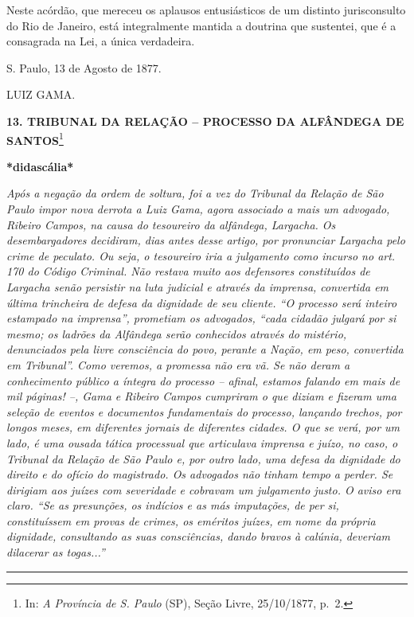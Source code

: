 Neste acórdão, que mereceu os aplausos entusiásticos de um distinto
jurisconsulto do Rio de Janeiro, está integralmente mantida a doutrina
que sustentei, que é a consagrada na Lei, a única verdadeira.

S. Paulo, 13 de Agosto de 1877.

LUIZ GAMA.

\textbf{13. TRIBUNAL DA RELAÇÃO -- PROCESSO DA ALFÂNDEGA DE
SANTOS}\footnote{In: \emph{A Província de S. Paulo} (SP), Seção Livre,
  25/10/1877, p.~2.}

\textbf{*didascália*}

\emph{Após a negação da ordem de soltura, foi a vez do Tribunal da
Relação de São Paulo impor nova derrota a Luiz Gama, agora associado a
mais um advogado, Ribeiro Campos, na causa do tesoureiro da alfândega,
Largacha. Os desembargadores decidiram, dias antes desse artigo, por
pronunciar Largacha pelo crime de peculato. Ou seja, o tesoureiro iria a
julgamento como incurso no art. 170 do Código Criminal. Não restava
muito aos defensores constituídos de Largacha senão persistir na luta
judicial e através da imprensa, convertida em última trincheira de
defesa da dignidade de seu cliente. ``O processo será inteiro estampado
na imprensa'', prometiam os advogados, ``cada cidadão julgará por si
mesmo; os ladrões da Alfândega serão conhecidos através do mistério,
denunciados pela livre consciência do povo, perante a Nação, em peso,
convertida em Tribunal''. Como veremos, a promessa não era vã. Se não
deram a conhecimento público a íntegra do processo -- afinal, estamos
falando em mais de mil páginas! --, Gama e Ribeiro Campos cumpriram o
que diziam e fizeram uma seleção de eventos e documentos fundamentais do
processo, lançando trechos, por longos meses, em diferentes jornais de
diferentes cidades. O que se verá, por um lado, é uma ousada tática
processual que articulava imprensa e juízo, no caso, o Tribunal da
Relação de São Paulo e, por outro lado, uma defesa da dignidade do
direito e do ofício do magistrado. Os advogados não tinham tempo a
perder. Se dirigiam aos juízes com severidade e cobravam um julgamento
justo. O aviso era claro. ``Se as presunções, os indícios e as más
imputações, de per si, constituíssem em provas de crimes, os eméritos
juízes, em nome da própria dignidade, consultando as suas consciências,
dando bravos à calúnia, deveriam dilacerar as togas...'' }

\begin{center}\rule{0.5\linewidth}{\linethickness}\end{center}

